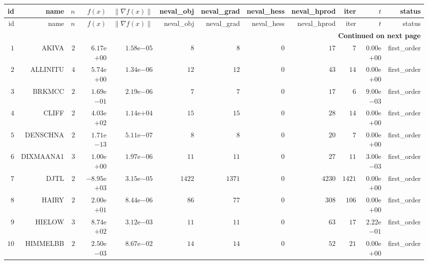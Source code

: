 \begin{longtable}{rrrrrrrrrrrr}
  \hline
  id & name & \(n\) & \(f(x)\) & \(\|\nabla f(x)\|\) & neval\_obj & neval\_grad & neval\_hess & neval\_hprod & iter & \(t\) & status \\\hline
  \endfirsthead
  \hline
  id & name & \(n\) & \(f(x)\) & \(\|\nabla f(x)\|\) & neval\_obj & neval\_grad & neval\_hess & neval\_hprod & iter & \(t\) & status \\\hline
  \endhead
  \hline
  \multicolumn{12}{r}{{\bfseries Continued on next page}}\\
  \hline
  \endfoot
  \endlastfoot
  \(     1\) & AKIVA & \(     2\) & \( 6.17\)e\(+00\) & \( 1.58\)e\(-05\) & \(     8\) & \(     8\) & \(     0\) & \(    17\) & \(     7\) & \( 0.00\)e\(+00\) & first\_order \\
  \(     2\) & ALLINITU & \(     4\) & \( 5.74\)e\(+00\) & \( 1.34\)e\(-06\) & \(    12\) & \(    12\) & \(     0\) & \(    43\) & \(    14\) & \( 0.00\)e\(+00\) & first\_order \\
  \(     3\) & BRKMCC & \(     2\) & \( 1.69\)e\(-01\) & \( 2.19\)e\(-06\) & \(     7\) & \(     7\) & \(     0\) & \(    17\) & \(     6\) & \( 9.00\)e\(-03\) & first\_order \\
  \(     4\) & CLIFF & \(     2\) & \( 4.03\)e\(+02\) & \( 1.14\)e\(+04\) & \(    15\) & \(    15\) & \(     0\) & \(    28\) & \(    14\) & \( 0.00\)e\(+00\) & first\_order \\
  \(     5\) & DENSCHNA & \(     2\) & \( 1.71\)e\(-13\) & \( 5.11\)e\(-07\) & \(     8\) & \(     8\) & \(     0\) & \(    20\) & \(     7\) & \( 0.00\)e\(+00\) & first\_order \\
  \(     6\) & DIXMAANA1 & \(     3\) & \( 1.00\)e\(+00\) & \( 1.97\)e\(-06\) & \(    11\) & \(    11\) & \(     0\) & \(    27\) & \(    11\) & \( 3.00\)e\(-03\) & first\_order \\
  \(     7\) & DJTL & \(     2\) & \(-8.95\)e\(+03\) & \( 3.15\)e\(-05\) & \(  1422\) & \(  1371\) & \(     0\) & \(  4230\) & \(  1421\) & \( 0.00\)e\(+00\) & first\_order \\
  \(     8\) & HAIRY & \(     2\) & \( 2.00\)e\(+01\) & \( 8.44\)e\(-06\) & \(    86\) & \(    77\) & \(     0\) & \(   308\) & \(   106\) & \( 0.00\)e\(+00\) & first\_order \\
  \(     9\) & HIELOW & \(     3\) & \( 8.74\)e\(+02\) & \( 3.12\)e\(-03\) & \(    11\) & \(    11\) & \(     0\) & \(    63\) & \(    17\) & \( 2.22\)e\(-01\) & first\_order \\
  \(    10\) & HIMMELBB & \(     2\) & \( 2.50\)e\(-03\) & \( 8.67\)e\(-02\) & \(    14\) & \(    14\) & \(     0\) & \(    52\) & \(    21\) & \( 0.00\)e\(+00\) & first\_order \\

\end{longtable}
